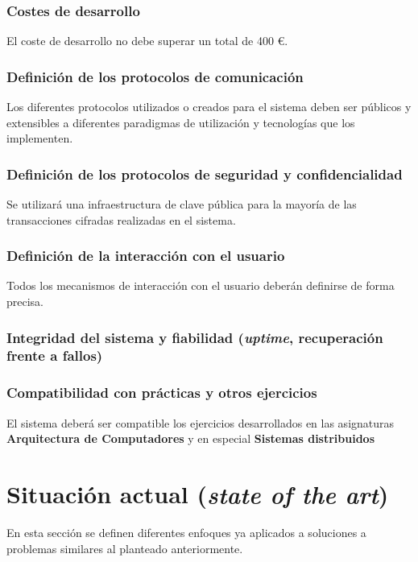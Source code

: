 \subsubsection{Costes de desarrollo}

El coste de desarrollo no debe superar un total de 400 €.

\subsubsection{Definición de los protocolos de comunicación}

Los diferentes protocolos utilizados o creados para el sistema deben ser públicos y extensibles a diferentes paradigmas de utilización y tecnologías que los implementen.

\subsubsection{Definición de los protocolos de seguridad y confidencialidad}

Se utilizará una infraestructura de clave pública para la mayoría de las transacciones cifradas realizadas en el sistema.

\subsubsection{Definición de la interacción con el usuario}

Todos los mecanismos de interacción con el usuario deberán definirse de forma precisa.

\subsubsection{Integridad del sistema y fiabilidad (\textit{uptime}, recuperación frente a fallos)}

\subsubsection{Compatibilidad con prácticas y otros ejercicios}

El sistema deberá ser compatible los ejercicios desarrollados en las asignaturas \textbf{Arquitectura de Computadores} y en especial \textbf{Sistemas distribuidos}

\section{Situación actual (\textit{state of the art})}
\label{stateoftheart}
En esta sección se definen diferentes enfoques ya aplicados a soluciones a problemas similares al planteado anteriormente.

